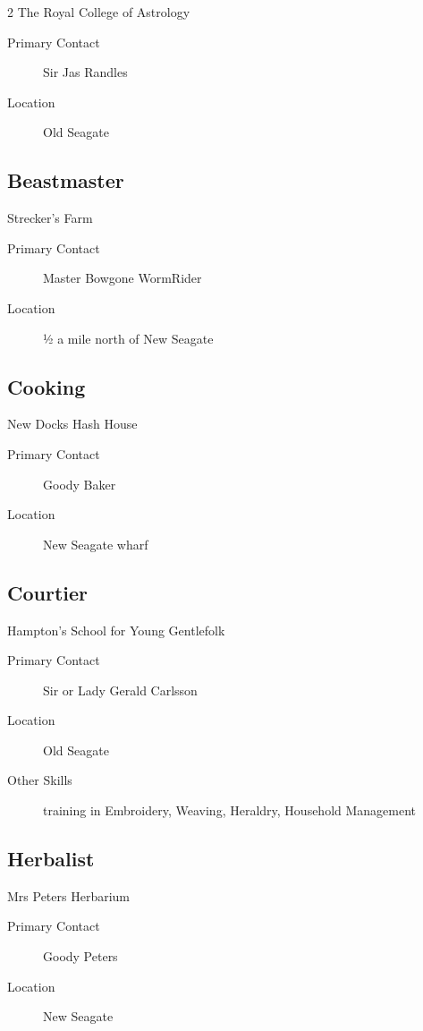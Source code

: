 \begin{multicols}{2}
The Royal College of Astrology
\begin{description}
\item[Primary Contact] Sir Jas Randles
\item[Location] Old Seagate
\end{description}

\subsection{Beastmaster}

Strecker’s Farm
\begin{description}
\item[Primary Contact] Master Bowgone WormRider
\item[Location] ½ a mile north of New Seagate
\end{description}

\subsection{Cooking}

New Docks Hash House

\begin{description}
\item[Primary Contact] Goody Baker
\item[Location] New Seagate wharf
\end{description}

\subsection{Courtier}

Hampton’s School for Young Gentlefolk
\begin{description}
\item[Primary Contact] Sir or Lady Gerald Carlsson
\item[Location] Old Seagate
\item[Other Skills] training in Embroidery, Weaving,
Heraldry, Household Management
\end{description}

\subsection{Herbalist}

Mrs Peters Herbarium

\begin{description}
\item[Primary Contact] Goody Peters
\item[Location] New Seagate
\end{description}


\end{multicols}
